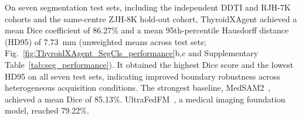 \documentclass[fleqn,10pt]{wlscirep}
\begin{document}
On seven segmentation test sets, including the independent DDTI and RJH-7K cohorts and the same-centre ZJH-8K hold-out cohort, ThyroidXAgent achieved a mean Dice coefficient of 86.27\% and a mean 95th-percentile Hausdorff distance (HD95) of 7.73~mm (unweighted means across test sets; Fig.~\ref{fig:ThyroidXAgent_SegCls_performance}b,c and Supplementary Table~\ref{tab:seg_performance}). It obtained the highest Dice score and the lowest HD95 on all seven test sets, indicating improved boundary robustness across heterogeneous acquisition conditions. The strongest baseline, MedSAM2~\cite{ma2025medsam2}, achieved a mean Dice of 85.13\%. UltraFedFM~\cite{jiang2025pretraining}, a medical imaging foundation model, reached 79.22\%.

\end{document}
